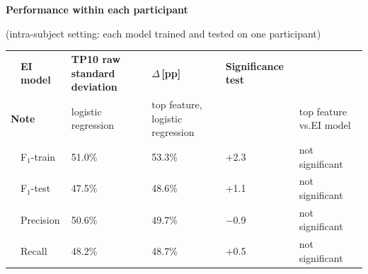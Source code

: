 \begin{table}[H]
\centering
{}
\small
\renewcommand{\arraystretch}{1.12}
\setlength{\tabcolsep}{2pt}
{\raggedright\textbf{Performance within each participant}\par {\footnotesize\textcolor{headGray}{(intra-subject setting: each model trained and tested on one participant)}}\par}
\vspace{3pt}
\begin{tabularx}{\textwidth}{c l >{\centering\arraybackslash}p{2.5cm} >{\centering\arraybackslash}X >{\centering\arraybackslash}p{1.5cm}|>{\centering\arraybackslash}p{2.95cm}}
\arrayrulecolor{black}\hline
\multicolumn{2}{l}{\footnotesize\textbf{Metric}} & {\footnotesize\textbf{EI model}} & {\footnotesize\textbf{TP10 raw standard deviation}} & {\footnotesize\textbf{\(\Delta\)\,[pp]}} & {\footnotesize\textbf{Significance test}} \\
\multicolumn{2}{l}{{\scriptsize\textcolor{headGray}{\textbf{Note}}}} & {\scriptsize\textcolor{headGray}{logistic regression}} & {\scriptsize\textcolor{headGray}{top feature, logistic regression}} &  & {\scriptsize\textcolor{headGray}{top feature vs.\newline EI model}} \\
\hline
\cellcolor{classBox} & \textcolor{nsGray}{F\(_1\)-train} & \textcolor{nsGray}{51.0\%} & \textcolor{nsGray}{53.3\%} & \textcolor{nsGray}{+2.3} & {\footnotesize\textcolor{nsGray}{not significant}} \\
\arrayrulecolor{ruleGray}\cline{2-6}
\cellcolor{classBox} & \textcolor{nsGray}{F\(_1\)-test} & \textcolor{nsGray}{47.5\%} & \textcolor{nsGray}{48.6\%} & \textcolor{nsGray}{+1.1} & {\footnotesize\textcolor{nsGray}{not significant}} \\
\arrayrulecolor{ruleGray}\cline{2-6}
\cellcolor{classBox} & \textcolor{nsGray}{Precision} & \textcolor{nsGray}{50.6\%} & \textcolor{nsGray}{49.7\%} & \textcolor{nsGray}{\(-\)0.9} & {\footnotesize\textcolor{nsGray}{not significant}} \\
\arrayrulecolor{ruleGray}\cline{2-6}
\cellcolor{classBox}\multirow{-4}{*}{\rotatebox[origin=c]{90}{\texttt{STAY}}} & \textcolor{nsGray}{Recall} & \textcolor{nsGray}{48.2\%} & \textcolor{nsGray}{48.7\%} & \textcolor{nsGray}{+0.5} & {\footnotesize\textcolor{nsGray}{not significant}} \\

\end{tabularx}
\end{table}
